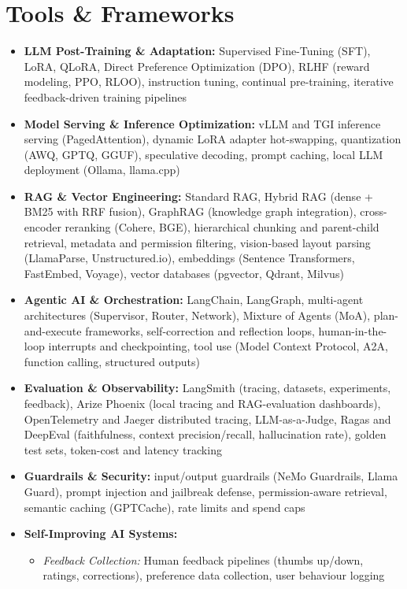 \documentclass[11pt,a4paper]{article}
\begin{document}
\section*{Tools \& Frameworks}
\begin{itemize}
    \item \textbf{LLM Post-Training \& Adaptation:} Supervised Fine-Tuning (SFT), LoRA, QLoRA, Direct Preference
Optimization (DPO), RLHF (reward modeling, PPO, RLOO), instruction tuning, continual pre-training, iterative
feedback-driven training pipelines
    \item \textbf{Model Serving \& Inference Optimization:} vLLM and TGI inference serving (PagedAttention),
dynamic LoRA adapter hot-swapping, quantization (AWQ, GPTQ, GGUF), speculative decoding, prompt caching, local
LLM deployment (Ollama, llama.cpp)
    \item \textbf{RAG \& Vector Engineering:} Standard RAG, Hybrid RAG (dense + BM25 with RRF fusion), GraphRAG
(knowledge graph integration), cross-encoder reranking (Cohere, BGE), hierarchical chunking and parent-child
retrieval, metadata and permission filtering, vision-based layout parsing (LlamaParse, Unstructured.io), embeddings
(Sentence Transformers, FastEmbed, Voyage), vector databases (pgvector, Qdrant, Milvus)
    \item \textbf{Agentic AI \& Orchestration:} LangChain, LangGraph, multi-agent architectures (Supervisor,
Router, Network), Mixture of Agents (MoA), plan-and-execute frameworks, self-correction and
reflection loops, human-in-the-loop interrupts and checkpointing, tool use (Model Context Protocol, A2A, function
calling, structured outputs)
    \item \textbf{Evaluation \& Observability:} LangSmith (tracing, datasets, experiments, feedback), Arize Phoenix (local
tracing and RAG-evaluation dashboards), OpenTelemetry and Jaeger distributed tracing, LLM-as-a-Judge, Ragas and DeepEval
(faithfulness, context precision/recall, hallucination rate), golden test sets, token-cost and latency tracking
    \item \textbf{Guardrails \& Security:} input/output guardrails (NeMo Guardrails, Llama Guard), prompt injection and
jailbreak defense, permission-aware retrieval, semantic caching (GPTCache), rate limits and spend caps
    \item \textbf{Self-Improving AI Systems:}
    \begin{itemize}
        \item \textit{Feedback Collection:} Human feedback pipelines (thumbs up/down, ratings, corrections), preference data collection, user behaviour logging

\end{itemize}
\end{itemize}
\end{document}
